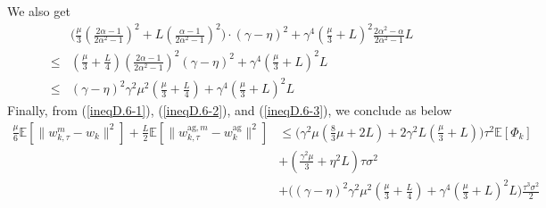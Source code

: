 \documentclass[11pt]{article}
\begin{document}
We also get
\begin{align} \label{ineqD.6-3}
    &\Big(\frac{\mu}{3} (\frac{2\alpha-1}{2\alpha^2 -1})^2 + L(\frac{\alpha-1}{2\alpha^2 -1})^2 \Big)\cdot (\gamma - \eta)^2 + \gamma^4 (\frac{\mu}{3} + L)^2 \frac{2\alpha^2 - \alpha}{2\alpha^2 - 1}L \nonumber\\
    \leq &(\frac{\mu}{3}+\frac{L}{4})(\frac{2\alpha-1}{2\alpha^2 -1})^2 (\gamma - \eta)^2 + \gamma^4 (\frac{\mu}{3} + L)^2 L \nonumber\\
    \leq &(\gamma - \eta)^2\gamma^2\mu^2(\frac{\mu}{3}+\frac{L}{4}) + \gamma^4 (\frac{\mu}{3} + L)^2 L
\end{align}
Finally, from (\ref{ineqD.6-1}), (\ref{ineqD.6-2}), and (\ref{ineqD.6-3}), we conclude as below
\begin{align*}
    \frac{\mu}{6}\mathbb{E}[\|w_{k, \tau}^m - w_k\|^2] + \frac{L}{2} \mathbb{E}[\|w_{k, \tau}^{\textrm{ag}, m} - w_k^{\textrm{ag}}\|^2] &\leq \Big( \gamma^2\mu(\frac{8}{3}\mu + 2L) + 2\gamma^2L(\frac{\mu}{3}+L)\Big)\tau^2 \mathbb{E}[\Phi_k] \\
    &+ (\frac{\gamma^2\mu}{3}+\eta^2 L)\tau\sigma^2 \\
    &+ \Big( (\gamma-\eta)^2\gamma^2\mu^2(\frac{\mu}{3}+\frac{L}{4})+\gamma^4(\frac{\mu}{3}+L)^2 L \Big) \frac{\tau^3\sigma^2}{2}
\end{align*}
\end{document}
